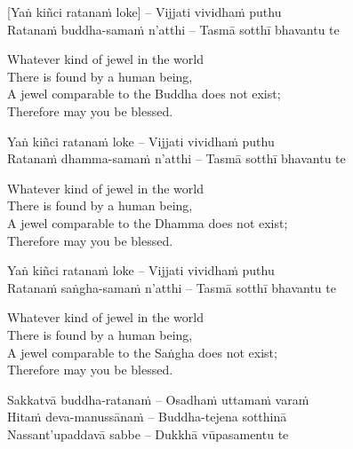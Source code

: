 \vspace{-1em}

[Yaṅ kiñci ratanaṁ loke] – Vijjati vividhaṁ puthu\\
Ratanaṁ buddha-samaṁ n'atthi – Tasmā sotthī bhavantu te

\begin{english-verses}
  Whatever kind of jewel in the world\\
  There is found by a human being,\\
  A jewel comparable to the Buddha does not exist;\\
  Therefore may you be blessed.
\end{english-verses}

Yaṅ kiñci ratanaṁ loke – Vijjati vividhaṁ puthu\\
Ratanaṁ dhamma-samaṁ n'atthi – Tasmā sotthī bhavantu te

\begin{english-verses}
  Whatever kind of jewel in the world\\
  There is found by a human being,\\
  A jewel comparable to the Dhamma does not exist;\\
  Therefore may you be blessed.
\end{english-verses}

Yaṅ kiñci ratanaṁ loke – Vijjati vividhaṁ puthu\\
Ratanaṁ saṅgha-samaṁ n'atthi – Tasmā sotthī bhavantu te

\begin{english-verses}
  Whatever kind of jewel in the world\\
  There is found by a human being,\\
  A jewel comparable to the Saṅgha does not exist;\\
  Therefore may you be blessed.
\end{english-verses}

Sakkatvā buddha-ratanaṁ – Osadhaṁ\hyperlink{endnote124-appendix}{\hypertarget{endnote124-body}{}}
uttamaṁ varaṁ\\
Hitaṁ deva-manussānaṁ – Buddha-tejena sotthinā\\
Nassant'upaddavā sabbe – Dukkhā vūpasamentu te

